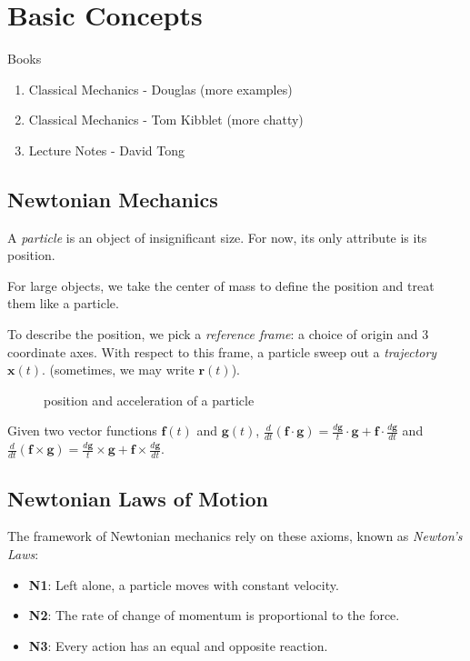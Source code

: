 \section{Basic Concepts}
Books
\begin{enumerate}
    \item Classical Mechanics - Douglas (more examples)
    \item Classical Mechanics - Tom Kibblet (more chatty)
    \item Lecture Notes - David Tong
\end{enumerate}
\subsection{Newtonian Mechanics}
A \textit{particle} is an object of insignificant size. For now, its only attribute is its position.

For large objects, we take the center of mass to define the position and treat them like a particle.

To describe the position, we pick a \textit{reference frame}: a choice of origin and 3 coordinate axes. With respect to this frame, a particle sweep out a \textit{trajectory} $\mathbf{x} (t).$ (sometimes, we may write $\mathbf{r} (t)$).

\begin{figure}[H]
    \centering
    \caption{position and acceleration of a particle}
    \label{fig:va}
\end{figure}

Given two vector functions $\mathbf{f}(t)$ and $\mathbf{g} (t)$, $\frac{d}{dt}(\mathbf{f} \cdot \mathbf{g} ) = \frac{d \mathbf{g} }{t}\cdot \mathbf{g}  + \mathbf{f}  \cdot \frac{d \mathbf{g} }{dt}$ and $\frac{d}{dt}(\mathbf{f} \times \mathbf{g} ) = \frac{d \mathbf{g} }{t}\times \mathbf{g}  + \mathbf{f}  \times \frac{d \mathbf{g} }{dt}$.

\subsection{Newtonian Laws of Motion}
The framework of Newtonian mechanics rely on these axioms, known as \textit{Newton's Laws}:
\begin{itemize}
    \item \textbf{N1}: Left alone, a particle moves with constant velocity.
    \item \textbf{N2}: The rate of change of momentum is proportional to the force.
    \item \textbf{N3}: Every action has an equal and opposite reaction.
\end{itemize}
